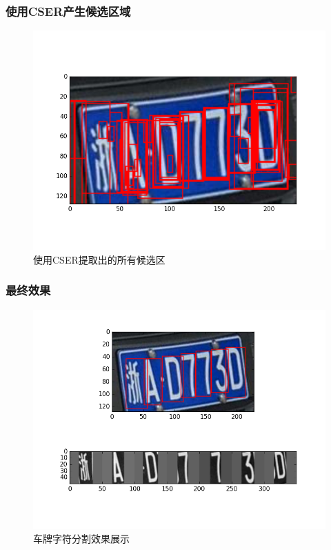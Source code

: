 \documentclass[UTF8]{beamer}
\begin{document}
\begin{frame}
  \frametitle{使用CSER产生候选区域}
  
  \begin{figure}[ht]
    \centering
    \includegraphics[height=0.6\textheight]{./Figure/AllERs.png}
    \caption{使用CSER提取出的所有候选区}\label{Fig:AllERs}
  \end{figure}
\end{frame}

\begin{frame}
  \frametitle{最终效果}
  
  \begin{figure}[th]
    \centering
    \includegraphics[height=0.6\textheight, keepaspectratio]{./Figure/SegmentationDemo.png}
    \caption{车牌字符分割效果展示}\label{Fig:SegmentationDemo}
  \end{figure}
\end{frame}
\end{document}
